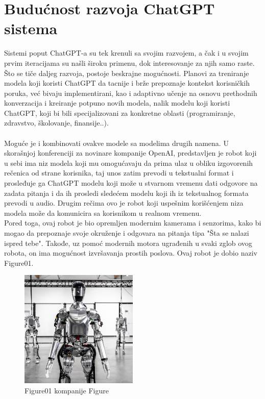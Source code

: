\documentclass[fleqn, 12pt]{article}
\begin{document}
\section{Budućnost razvoja ChatGPT sistema}
\begin{text}
Sistemi poput ChatGPT-a su tek krenuli sa svojim razvojem, a čak i u svojim prvim iteracijama su našli široku primenu, dok interesovanje za njih samo raste.
\\
Što se tiče daljeg razvoja, postoje beskrajne mogućnosti. Planovi za treniranje modela koji koristi ChatGPT da tacnije i brže prepoznaje kontekst korisničkih poruka, već bivaju implementirani, 
kao i adaptivno učenje na osnovu prethodnih konverzacija i kreiranje potpuno novih modela, nalik modelu koji koristi ChatGPT, koji bi bili specijalizovani za konkretne oblasti (programiranje, zdravstvo, školovanje, finansije..)\cite{G9}.
\\\\
Moguće je i kombinovati ovakve modele sa modelima drugih namena. U skorašnjoj konferenciji za novinare kompanije OpenAI, predstavljen je robot koji u sebi ima niz modela koji mu omogućavaju da prima ulaz u obliku izgovorenih rečenica od strane korisnika, taj unos zatim prevodi u tekstualni format i prosleđuje ga ChatGPT modelu koji može u stvarnom vremenu dati odgovore na zadata pitanja i da ih prosledi sledećem modelu koji ih iz tekstualnog formata prevodi u audio. Drugim rečima ovo je robot koji uspešnim korišćenjem niza modela može da komunicira sa korisnikom u realnom vremenu\cite{G10}.
\\
Pored toga, ovaj robot je bio opremljen modernim kamerama i senzorima, kako bi mogao da prepoznaje svoje okruženje i odgovara na pitanja tipa "Šta se nalazi ispred tebe". Takođe, uz pomoć modernih motora ugrađenih u svaki zglob ovog robota, on ima mogućnost izvršavanja prostih poslova. Ovaj robot je dobio naziv Figure01\cite{G10}.
\end{text}

\begin{figure}[h]
    \centering
    \includegraphics[width=0.5\textwidth]{Figure.jpg}
    \caption{Figure01 kompanije Figure}
\end{figure}
\end{document}
